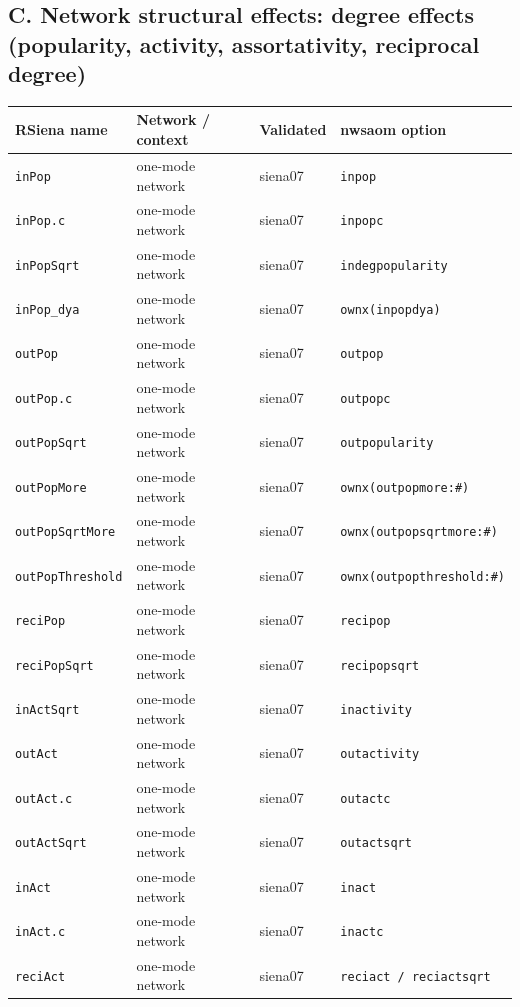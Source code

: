 \subsection*{C. Network structural effects: degree effects (popularity, activity, assortativity, reciprocal degree)}
\footnotesize
\begin{longtable}{@{}p{2.6cm}p{3.2cm}p{2.9cm}p{5.4cm}@{}}
\toprule
RSiena name & Network / context & Validated & nwsaom option\\
\midrule
\endhead
\texttt{inPop} & one-mode network & siena07 & \texttt{inpop}\\
\texttt{inPop.c} & one-mode network & siena07 & \texttt{inpopc}\\
\texttt{inPopSqrt} & one-mode network & siena07 & \texttt{indegpopularity}\\
\texttt{inPop\_dya} & one-mode network & siena07 & \texttt{ownx(inpopdya)}\\
\texttt{outPop} & one-mode network & siena07 & \texttt{outpop}\\
\texttt{outPop.c} & one-mode network & siena07 & \texttt{outpopc}\\
\texttt{outPopSqrt} & one-mode network & siena07 & \texttt{outpopularity}\\
\texttt{outPopMore} & one-mode network & siena07 & \texttt{ownx(outpopmore:\#)}\\
\texttt{outPopSqrtMore} & one-mode network & siena07 & \texttt{ownx(outpopsqrtmore:\#)}\\
\texttt{outPopThreshold} & one-mode network & siena07 & \texttt{ownx(outpopthreshold:\#)}\\
\texttt{reciPop} & one-mode network & siena07 & \texttt{recipop}\\
\texttt{reciPopSqrt} & one-mode network & siena07 & \texttt{recipopsqrt}\\
\texttt{inActSqrt} & one-mode network & siena07 & \texttt{inactivity}\\
\texttt{outAct} & one-mode network & siena07 & \texttt{outactivity}\\
\texttt{outAct.c} & one-mode network & siena07 & \texttt{outactc}\\
\texttt{outActSqrt} & one-mode network & siena07 & \texttt{outactsqrt}\\
\texttt{inAct} & one-mode network & siena07 & \texttt{inact}\\
\texttt{inAct.c} & one-mode network & siena07 & \texttt{inactc}\\
\texttt{reciAct} & one-mode network & siena07 & \texttt{reciact / reciactsqrt}\\

\end{longtable}
